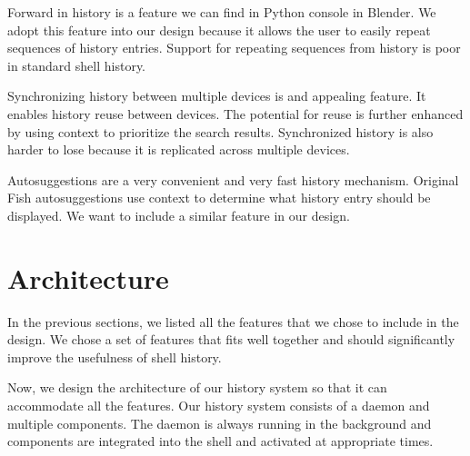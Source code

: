 \documentclass[thesis=M,english]{FITthesis}[2012/10/20]
\begin{document}

Forward in history is a feature we can find in Python console in Blender. We adopt this feature into our design because it allows the user to easily repeat sequences of history entries. Support for repeating sequences from history is poor in standard shell history.


Synchronizing history between multiple devices is and appealing feature. It enables history reuse between devices. The potential for reuse is further enhanced by using context to prioritize the search results.
Synchronized history is also harder to lose because it is replicated across multiple devices. 


Autosuggestions are a very convenient and very fast history mechanism. Original Fish autosuggestions use context to determine what history entry should be displayed.
We want to include a similar feature in our design.

\newpage
\section{Architecture}

In the previous sections, we listed all the features that we chose to include in the design. We chose a set of features that fits well together and should significantly improve the usefulness of shell history.

Now, we design the architecture of our history system so that it can accommodate all the features. 
Our history system consists of a daemon and multiple components. The daemon is always running in the background and components are integrated into the shell and activated at appropriate times. 

\end{document}
